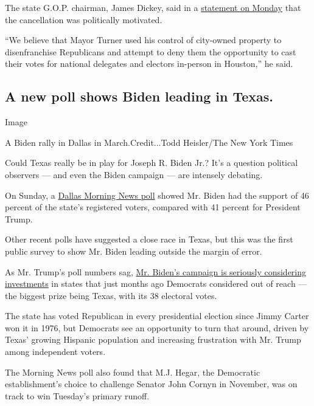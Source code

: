 The state G.O.P. chairman, James Dickey, said in a
\href{https://www.texasgop.org/republican-party-of-texas-chairman-james-dickey-on-supreme-court-of-texas-ruling-in-rpt-lawsuit-against-city-of-houston-mayor-sylvester-turner-and-houston-first/}{statement
on Monday} that the cancellation was politically motivated.

``We believe that Mayor Turner used his control of city-owned property
to disenfranchise Republicans and attempt to deny them the opportunity
to cast their votes for national delegates and electors in-person in
Houston,'' he said.

\hypertarget{a-new-poll-shows-biden-leading-in-texas}{%
\subsection{A new poll shows Biden leading in
Texas.}\label{a-new-poll-shows-biden-leading-in-texas}}

Image

A Biden rally in Dallas in March.Credit...Todd Heisler/The New York
Times

Could Texas really be in play for Joseph R. Biden Jr.? It's a question
political observers --- and even the Biden campaign --- are intensely
debating.

On Sunday, a
\href{https://www.dallasnews.com/news/public-health/2020/07/12/joe-biden-builds-lead-over-donald-trump-in-reliably-red-texas-as-voters-sour-on-handling-of-virus/}{Dallas
Morning News poll} showed Mr. Biden had the support of 46 percent of the
state's registered voters, compared with 41 percent for President Trump.

Other recent polls have suggested a close race in Texas, but this was
the first public survey to show Mr. Biden leading outside the margin of
error.

As Mr. Trump's poll numbers sag,
\href{https://www.nytimes.com/2020/07/11/us/politics/trump-biden-2020-election.html}{Mr.
Biden's campaign is seriously considering investments} in states that
just months ago Democrats considered out of reach --- the biggest prize
being Texas, with its 38 electoral votes.

The state has voted Republican in every presidential election since
Jimmy Carter won it in 1976, but Democrats see an opportunity to turn
that around, driven by Texas' growing Hispanic population and increasing
frustration with Mr. Trump among independent voters.

The Morning News poll also found that M.J. Hegar, the Democratic
establishment's choice to challenge Senator John Cornyn in November, was
on track to win Tuesday's primary runoff.


